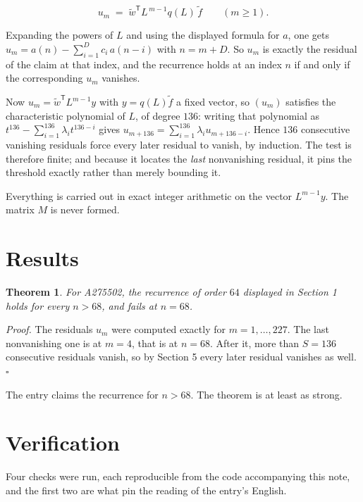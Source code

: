 \documentclass[11pt]{article}
\newtheorem{theorem}{Theorem}
\theoremstyle{definition}
\begin{document}
\[u_m \;=\; \tilde w^{\mathsf T} L^{\,m-1} q(L)\,\tilde f \qquad (m \ge 1).\]

Expanding the powers of $L$ and using the displayed formula for $a$, one gets $u_m = a(n) - \sum_{i=1}^{D} c_i\,a(n-i)$ with $n = m + D$. So $u_m$ is exactly the residual of the claim at that index, and the recurrence holds at an index $n$ if and only if the corresponding $u_m$ vanishes.

Now $u_m = \tilde w^{\mathsf T} L^{m-1} y$ with $y = q(L)\tilde f$ a fixed vector, so $(u_m)$ satisfies the characteristic polynomial of $L$, of degree $136$: writing that polynomial as $t^{136} - \sum_{i=1}^{136} \lambda_i t^{136-i}$ gives $u_{m+136} = \sum_{i=1}^{136} \lambda_i u_{m+136-i}$. Hence $136$ consecutive vanishing residuals force every later residual to vanish, by induction. The test is therefore finite; and because it locates the {\itshape last} nonvanishing residual, it pins the threshold exactly rather than merely bounding it.

Everything is carried out in exact integer arithmetic on the vector $L^{m-1}y$. The matrix $M$ is never formed.

\section{Results}

\begin{theorem} For A275502, the recurrence of order $64$ displayed in Section 1 holds for every $n > 68$, and fails at $n = 68$.\end{theorem}

{\itshape Proof.} The residuals $u_m$ were computed exactly for $m = 1,\dots,227$. The last nonvanishing one is at $m = 4$, that is at $n = 68$. After it, more than $S = 136$ consecutive residuals vanish, so by Section 5 every later residual vanishes as well. $\square$

The entry claims the recurrence for $n > 68$. The theorem is at least as strong.

\section{Verification}

Four checks were run, each reproducible from the code accompanying this note, and the first two are what pin the reading of the entry's English.
\end{document}
